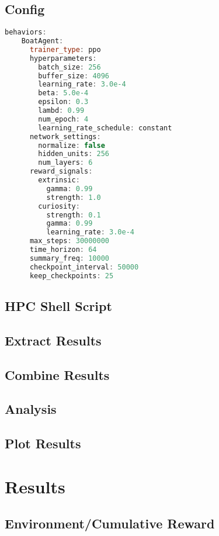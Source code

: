   \subsection{Config}\label{config}
  \begin{adjustbox}{width=\textwidth/2}
  \begin{lstlisting}[language=C++]
      behaviors:
    BoatAgent:
      trainer_type: ppo
      hyperparameters:
        batch_size: 256
        buffer_size: 4096
        learning_rate: 3.0e-4
        beta: 5.0e-4
        epsilon: 0.3
        lambd: 0.99
        num_epoch: 4
        learning_rate_schedule: constant
      network_settings:
        normalize: false
        hidden_units: 256
        num_layers: 6
      reward_signals:
        extrinsic:
          gamma: 0.99
          strength: 1.0
        curiosity:
          strength: 0.1
          gamma: 0.99
          learning_rate: 3.0e-4
      max_steps: 30000000
      time_horizon: 64
      summary_freq: 10000
      checkpoint_interval: 50000
      keep_checkpoints: 25
  \end{lstlisting}
  \end{adjustbox}

  \subsection{HPC Shell Script}\label{sec:shell_script}
  
  \subsection{Extract Results}\label{sec:extract_results}

  \subsection{Combine Results}\label{sec:combine_results}

  \subsection{Analysis}\label{sec:analysis}

  \subsection{Plot Results}\label{sec:plot_results}

\section{Results}

\subsection{Environment/Cumulative Reward}\label{sec:env_cum_reward}





\